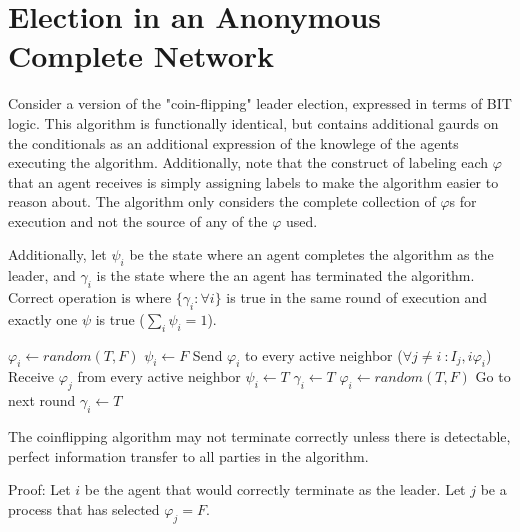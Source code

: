 \section{Election in an Anonymous Complete Network}

Consider a version of the "coin-flipping" leader election, expressed in terms of BIT logic.
This algorithm is functionally identical, but contains additional gaurds on the conditionals as an additional expression of the knowlege of the agents executing the algorithm.
Additionally, note that the construct of labeling each $\varphi$ that an agent receives is simply assigning labels to make the algorithm easier to reason about.
The algorithm only considers the complete collection of $\varphi$s for execution and not the source of any of the $\varphi$ used.

Additionally, let $\psi_i$ be the state where an agent completes the algorithm as the leader, and $\gamma_i$ is the state where the an agent has terminated the algorithm.
Correct operation is where $\{\gamma_i : \forall i \}$ is true in the same round of execution and exactly one $\psi$ is true ($\sum_i \psi_i = 1$).

\begin{algorithmic}[1]
\small
\State $\varphi_i \gets random(T,F)$
\State $\psi_i \gets F$
\State Send $\varphi_i$ to every active neighbor ($\forall j \neq i\ : I_j,i \varphi_i$)
\State Receive $\varphi_j$ from every active neighbor 
	\State $\psi_i \gets T$
	\State $\gamma_i \gets T$
	\State $\varphi_i \gets random(T,F)$
	\State Go to next round
	\State $\gamma_i \gets T$
\EndIf
\end{algorithmic}

\begin{thm}
The coinflipping algorithm may not terminate correctly unless there is detectable, perfect information transfer to all parties in the algorithm.
\end{thm}

Proof: Let $i$ be the agent that would correctly terminate as the leader. Let $j$ be a process that has selected $\varphi_j = F$.

